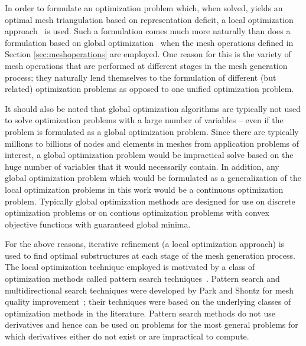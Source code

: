 In order to formulate an optimization problem which, when solved, yields 
an optimal mesh triangulation based on representation deficit, a local 
optimization approach~\cite{nocedal_wright_book} is used. Such a 
formulation comes much more naturally than does a formulation based on 
global optimization~\cite{global_optimization_book} when the 
mesh operations defined in Section \ref{sec:meshoperations} are 
employed. One reason for this is the variety of mesh operations that are 
performed at different stages in the mesh generation process; they 
naturally lend themselves to the formulation of different (but related) 
optimization problems as opposed to one unified optimization problem.

It should also be noted that global optimization algorithms are typically 
not used to solve optimization problems with a large number of variables 
-- even if the problem is formulated as a global optimization problem. 
Since there are typically millions to billions of nodes and elements in 
meshes from application problems of interest, a global optimization 
problem would be impractical solve based on the huge number of variables 
that it would necessarily contain. In addition, any global optimization 
problem which would be formulated as a generalization of the local 
optimization problems in this work would be a continuous optimization 
problem. Typically global optimization methods are designed for use on 
discrete optimization problems or on contious optimization problems with 
convex objective functions with guaranteed global minima.

For the above reasons, iterative refinement (a local optimization 
approach) is used to find optimal substructures at each stage of the mesh 
generation process. The local optimization technique employed is
motivated by a class of optimization methods called pattern search 
techniques~\cite{patternsearch1}. Pattern search and multidirectional 
search techniques were developed by Park and Shontz for mesh quality 
improvement~\cite{patternsearch4}; their techniques were based on the 
underlying classes of optimization methods in the literature. Pattern 
search methods do not use derivatives and hence can be used on problems for 
the most general problems for which derivatives either do not exist or are 
impractical to compute.

